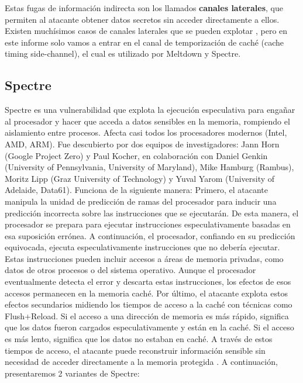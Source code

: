 \documentclass[lettersize,compsoc]{IEEEtran}
\begin{document}
Estas fugas de información indirecta son los llamados \textbf{canales laterales}, que permiten al atacante obtener datos secretos sin acceder directamente a ellos. \newline
Existen muchísimos casos de canales laterales que se pueden explotar \cite{Side Channel tipos}, pero en este informe solo vamos a entrar en el canal de temporización de caché (cache timing side-channel), el cual es utilizado por Meltdown y Spectre.

\subsection{Spectre}
Spectre es una vulnerabilidad que explota la ejecución especulativa para engañar al procesador y hacer que acceda a datos sensibles en la memoria, rompiendo el aislamiento entre procesos. \cite{spectre}
\newline Afecta casi todos los procesadores modernos (Intel, AMD, ARM).
\newline Fue descubierto por dos equipos de investigadores: Jann Horn (Google Project Zero) y Paul Kocher, en colaboración con Daniel Genkin (University of Pennsylvania, University of Maryland), Mike Hamburg (Rambus), Moritz Lipp (Graz University of Technology) y Yuval Yarom (University of Adelaide, Data61).
\newline Funciona de la siguiente manera:
Primero, el atacante manipula la unidad de predicción de ramas del procesador para inducir una predicción incorrecta sobre las instrucciones que se ejecutarán. De esta manera, el procesador se prepara para ejecutar instrucciones especulativamente basadas en esa suposición errónea.
A continuación, el procesador, confiando en su predicción equivocada, ejecuta especulativamente instrucciones que no debería ejecutar. Estas instrucciones pueden incluir accesos a áreas de memoria privadas, como datos de otros procesos o del sistema operativo. Aunque el procesador eventualmente detecta el error y descarta estas instrucciones, los efectos de esos accesos permanecen en la memoria caché.
Por último, el atacante explota estos efectos secundarios midiendo los tiempos de acceso a la caché con técnicas como Flush+Reload. Si el acceso a una dirección de memoria es más rápido, significa que los datos fueron cargados especulativamente y están en la caché. Si el acceso es más lento, significa que los datos no estaban en caché. A través de estos tiempos de acceso, el atacante puede reconstruir información sensible sin necesidad de acceder directamente a la memoria protegida \cite{spectre}.
\newline A continuación, presentaremos 2 variantes de Spectre:
\end{document}
